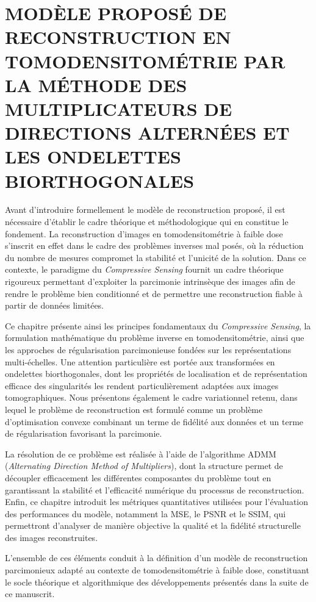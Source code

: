 \chapter{MODÈLE PROPOSÉ DE RECONSTRUCTION EN TOMODENSITOMÉTRIE PAR LA MÉTHODE DES MULTIPLICATEURS DE DIRECTIONS ALTERNÉES ET LES ONDELETTES BIORTHOGONALES}
\label{chapitre3} 

Avant d'introduire formellement le modèle de reconstruction proposé, il est nécessaire d'établir le cadre théorique et méthodologique qui en constitue le fondement. La reconstruction d'images en tomodensitométrie à faible dose s'inscrit en effet dans le cadre des problèmes inverses mal posés, où la réduction du nombre de mesures compromet la stabilité et l'unicité de la solution. Dans ce contexte, le paradigme du \textit{Compressive Sensing} fournit un cadre théorique rigoureux permettant d'exploiter la parcimonie intrinsèque des images afin de rendre le problème bien conditionné et de permettre une reconstruction fiable à partir de données limitées.

Ce chapitre présente ainsi les principes fondamentaux du \textit{Compressive Sensing}, la formulation mathématique du problème inverse en tomodensitométrie, ainsi que les approches de régularisation parcimonieuse fondées sur les représentations multi-échelles. Une attention particulière est portée aux transformées en ondelettes biorthogonales, dont les propriétés de localisation et de représentation efficace des singularités les rendent particulièrement adaptées aux images tomographiques. Nous présentons également le cadre variationnel retenu, dans lequel le problème de reconstruction est formulé comme un problème d'optimisation convexe combinant un terme de fidélité aux données et un terme de régularisation favorisant la parcimonie.

La résolution de ce problème est réalisée à l'aide de l'algorithme ADMM (\textit{Alternating Direction Method of Multipliers}), dont la structure permet de découpler efficacement les différentes composantes du problème tout en garantissant la stabilité et l'efficacité numérique du processus de reconstruction. Enfin, ce chapitre introduit les métriques quantitatives utilisées pour l'évaluation des performances du modèle, notamment la MSE, le PSNR et le SSIM, qui permettront d'analyser de manière objective la qualité et la fidélité structurelle des images reconstruites.

L'ensemble de ces éléments conduit à la définition d'un modèle de reconstruction parcimonieux adapté au contexte de tomodensitométrie à faible dose, constituant le socle théorique et algorithmique des développements présentés dans la suite de ce manuscrit.

